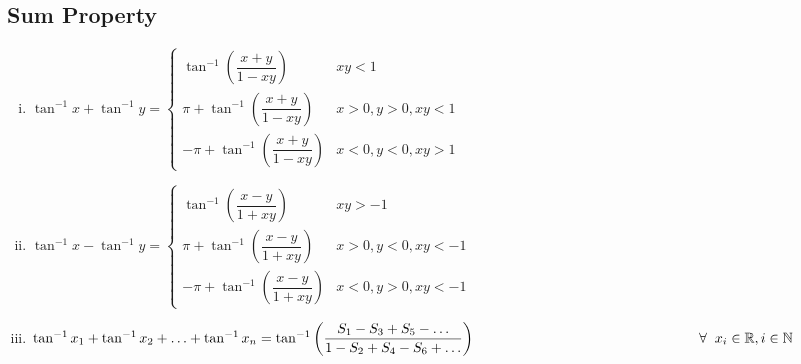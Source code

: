 \documentclass{article}
\begin{document}
\subsection{Sum Property}
\begin{enumerate}[i.]
    \item $\tan^{-1}x+\tan^{-1}y=\begin{cases}
        \tan^{-1}\left(\dfrac{x+y}{1-xy}\right) & xy<1 \\
        \pi + \tan^{-1}\left(\dfrac{x+y}{1-xy}\right) & x>0, y>0, xy<1 \\
        -\pi + \tan^{-1}\left(\dfrac{x+y}{1-xy}\right) & x<0, y<0, xy>1
    \end{cases}$
    \item $\tan^{-1}x-\tan^{-1}y=\begin{cases}
        \tan^{-1}\left(\dfrac{x-y}{1+xy}\right) & xy>-1 \\
        \pi +\tan^{-1}\left(\dfrac{x-y}{1+xy}\right) & x>0, y<0, xy<-1 \\
        -\pi +\tan^{-1}\left(\dfrac{x-y}{1+xy}\right) & x<0, y>0, xy<-1
    \end{cases}$
    \item $\tan^{-1}x_{1}+\tan^{-1}x_{2}+ \ldots + \tan^{-1}x_{n}=\tan^{-1}\left(\dfrac{S_{1}-S_{3}+S_{5}- \ldots}{1-S_{2}+S_{4}-S_{6}+\ldots}\right) \hfill \\ \hphantom{2cm} \hspace{5cm} \forall \hspace{2mm} x_{i} \in \mathbb{R}, i \in \mathbb{N} $
\end{enumerate}
\end{document}
